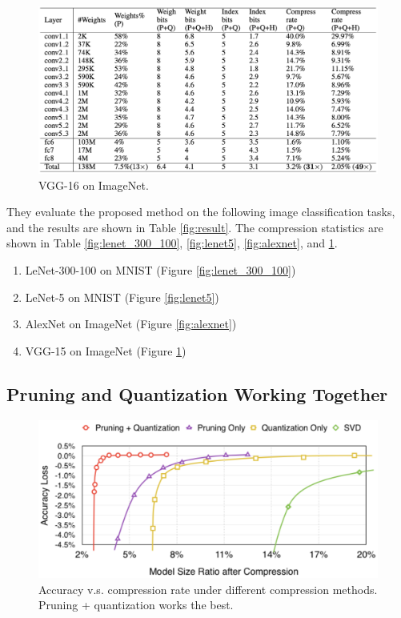 \documentclass[12pt]{article}
\begin{document}
\begin{figure}
    \centering
    \includegraphics[width=0.9\linewidth]{images/t5_vgg16.png}
    \caption{VGG-16 on ImageNet.}
    \label{fig:vgg16}
\end{figure}

They evaluate the proposed method on the following image classification tasks, and the results are shown in Table \ref{fig:result}. The compression statistics are shown in Table \ref{fig:lenet_300_100}, \ref{fig:lenet5}, \ref{fig:alexnet}, and \ref{fig:vgg16}.

\begin{enumerate}
    \item LeNet-300-100 on MNIST (Figure \ref{fig:lenet_300_100})
    \item LeNet-5 on MNIST (Figure \ref{fig:lenet5})
    \item AlexNet on ImageNet (Figure \ref{fig:alexnet})
    \item VGG-15 on ImageNet (Figure \ref{fig:vgg16})
\end{enumerate}

\subsection{Pruning and Quantization Working Together}

\begin{figure}
    \centering
    \includegraphics[width=0.7\linewidth]{images/f6_prune_quant.png}
    \caption{Accuracy v.s. compression rate under different compression methods. Pruning + quantization works the best.}
    \label{fig:prune_quant}
\end{figure}
\end{document}
